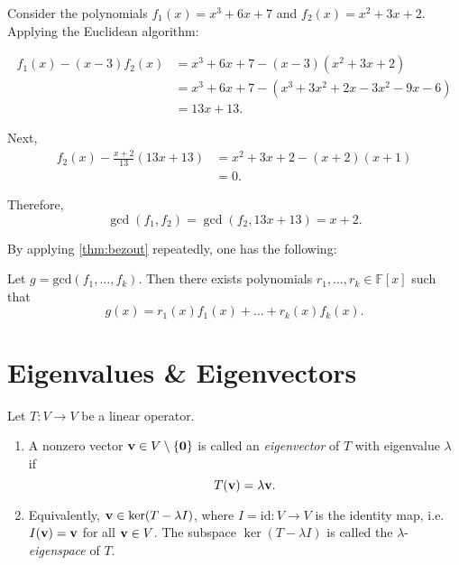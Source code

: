\begin{example}
Consider the polynomials \(f_1(x) = x^3 + 6x + 7\) and \(f_2(x) = x^2 + 3x + 2\). Applying the Euclidean algorithm:

\begin{align*}
f_1(x) - (x - 3)f_2(x) &= x^3 + 6x + 7 - (x - 3)(x^2 + 3x + 2) \\
&= x^3 + 6x + 7 - (x^3 + 3x^2 + 2x - 3x^2 - 9x - 6) \\
&= 13x + 13.
\end{align*}

Next,
\begin{align*}
f_2(x) - \frac{x + 2}{13}(13x + 13) &= x^2 + 3x + 2 - (x + 2)(x + 1) \\
&= 0.
\end{align*}

Therefore,
\[
\gcd(f_1, f_2) = \gcd(f_2, 13x + 13) = x + 2.
\]
\end{example}

By applying \autoref{thm:bezout} repeatedly, one has the following:
\begin{corollary} \label{cor:bezout}
    Let $g = \mathrm{gcd}(f_1, \dots, f_k)$. Then there exists polynomials $r_1, \dots, r_k \in \mathbb{F}[x]$ such that
    $$g(x) = r_1(x)f_1(x) + \dots + r_k(x)f_k(x).$$
\end{corollary}


\section{Eigenvalues \& Eigenvectors}

\begin{definition}\label{def:eigenvalue}
Let \( T : V \to V \) be a linear operator.

\begin{enumerate}
  \item A nonzero vector \( {\bf v} \in V \setminus \{ \mathbf{0} \} \) is called an \emph{eigenvector} of \(T\) with eigenvalue \(\lambda\) if
  \[
  T({\bf v}) = \lambda {\bf v}.
  \]
  
  \item Equivalently, \({\bf v} \in \ker(T - \lambda I)\), where \(I = \mathrm{id} : V \to V\) is the identity map, i.e. \(I({\bf v}) = {\bf v}\) for all \({\bf v} \in V\). The subspace \(\ker(T - \lambda I)\) is called the \(\lambda\)-\emph{eigenspace} of \(T\).
\end{enumerate}
\end{definition}

